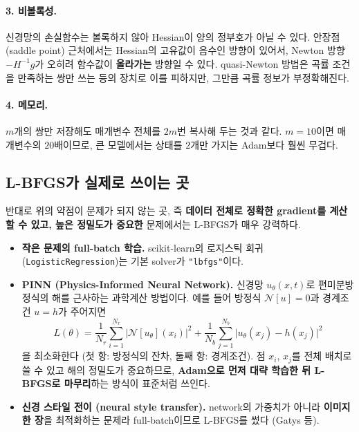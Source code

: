\documentclass[11pt,a4paper]{article}
\begin{document}
\paragraph{3. 비볼록성.}
신경망의 손실함수는 볼록하지 않아 Hessian이 양의 정부호가 아닐 수 있다.
안장점(saddle point) 근처에서는 Hessian의 고유값이 음수인 방향이 있어서,
Newton 방향 $-H^{-1}g$가 오히려 함수값이 \textbf{올라가는} 방향일 수 있다.
quasi-Newton 방법은 곡률 조건을 만족하는 쌍만 쓰는 등의 장치로 이를 피하지만, 그만큼 곡률 정보가 부정확해진다.

\paragraph{4. 메모리.}
$m$개의 쌍만 저장해도 매개변수 전체를 $2m$번 복사해 두는 것과 같다.
$m=10$이면 매개변수의 $20$배이므로, 큰 모델에서는 상태를 $2$개만 가지는 Adam보다 훨씬 무겁다.

\subsection{L-BFGS가 실제로 쓰이는 곳}

반대로 위의 약점이 문제가 되지 않는 곳, 즉
\textbf{데이터 전체로 정확한 gradient를 계산할 수 있고, 높은 정밀도가 중요한} 문제에서는 L-BFGS가 매우 강력하다.

\begin{itemize}[leftmargin=1.8em]
\item \textbf{작은 문제의 full-batch 학습.}
scikit-learn의 로지스틱 회귀(\texttt{LogisticRegression})는 기본 solver가 \texttt{"lbfgs"}이다.
\item \textbf{PINN (Physics-Informed Neural Network).}
신경망 $u_\theta(x,t)$로 편미분방정식의 해를 근사하는 과학계산 방법이다.
예를 들어 방정식 $\mathcal N[u]=0$과 경계조건 $u=h$가 주어지면
\[
L(\theta)=\frac{1}{N_r}\sum_{i=1}^{N_r}\bigl|\mathcal N[u_\theta](x_i)\bigr|^2
+\frac{1}{N_b}\sum_{j=1}^{N_b}\bigl|u_\theta(x_j)-h(x_j)\bigr|^2
\]
을 최소화한다 (첫 항: 방정식의 잔차, 둘째 항: 경계조건).
점 $x_i$, $x_j$를 전체 배치로 쓸 수 있고 해의 정밀도가 중요하므로,
\textbf{Adam으로 먼저 대략 학습한 뒤 L-BFGS로 마무리}하는 방식이 표준처럼 쓰인다.
\item \textbf{신경 스타일 전이 (neural style transfer).}
network의 가중치가 아니라 \textbf{이미지 한 장}을 최적화하는 문제라 full-batch이므로 L-BFGS를 썼다 (Gatys 등).
\end{itemize}
\end{document}
